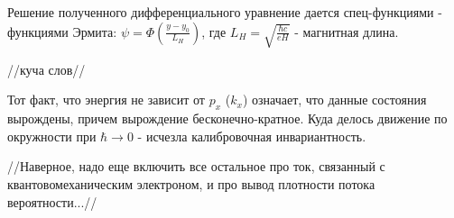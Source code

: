 \par Решение полученного дифференциального уравнение дается спец-функциями - функциями Эрмита: $\psi = \Phi \left(\frac{y-y_0}{L_H} \right)$, где $L_H= \sqrt{\frac{\hbar c}{eH}}$ - магнитная длина.
\par //куча слов//
\par Тот факт, что энергия не зависит от $p_x$ ($k_x$) означает, что данные состояния вырождены, причем вырождение бесконечно-кратное. Куда делось движение по окружности при $\hbar \rightarrow 0 $ - исчезла калибровочная инвариантность.

\par //Наверное, надо еще включить все остальное про ток, связанный с квантовомеханическим электроном, и про вывод плотности потока вероятности...//


